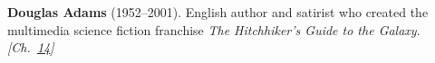 \textbf{Douglas Adams} (1952–2001). English author and satirist who created the multimedia science fiction franchise \emph{The Hitchhiker's Guide to the Galaxy}. \emph{[Ch.~\hyperref[ch:compacttwinparadox]{14}]}

